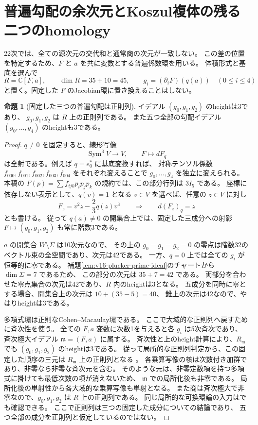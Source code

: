 \documentclass[a4paper,11pt]{ltjsarticle}
\theoremstyle{definition}
\newtheorem{proposition}[theorem]{命題}
\begin{document}
\section{普遍勾配の余次元とKoszul複体の残る二つのhomology}
\label{sec:v16-universal-koszul-height}

22次では、全ての源次元の交代和と通常商の次元が一致しない。
この差の位置を特定するため、$F$ と $a$ を共に変数とする普遍係数環を用いる。
体積形式と基底を選んで
\[
 R=\mathbb C[F,a],\qquad\dim R=35+10=45,
 \qquad g_i=(\partial_iF)(q(a))\quad(0\le i\le4)
\]
と置く。固定した $F$ のJacobian環に置き換えることはしない。

\begin{proposition}[固定した三つの普遍勾配は正則列]
\label{prop:v16-universal-three-gradient-regular}
イデアル $(g_0,g_1,g_2)$ のheightは3であり、
$g_0,g_1,g_2$ は $R$ 上の正則列である。
また五つ全部の勾配イデアル $(g_0,\ldots,g_4)$ のheightも3である。
\end{proposition}

\begin{proof}
$q\ne0$ を固定すると、線形写像
\[
 \operatorname{Sym}^3V\longrightarrow V,\qquad F\longmapsto dF_q
\]
は全射である。例えば $q=e_0^*$ に基底変換すれば、
対称テンソル係数 $f_{000},f_{001},f_{002},f_{003},f_{004}$ をそれぞれ変えることで
$g_0,\ldots,g_4$ を独立に変えられる。
本稿の $F(p)=\sum f_{ijk}p_ip_jp_k$ の規約では、この部分行列は $3I_5$ である。
座標に依存しない表示として、$q(v)=1$ となる $v\in V$ を選べば、任意の $z\in V$ に対し
\[
 F_z=v^2z-\frac23q(z)v^3
 \qquad\Longrightarrow\qquad d(F_z)_q=z
\]
とも書ける。
従って $q(a)\ne0$ の開集合上では、固定した三成分への射影
$F\mapsto(g_0,g_1,g_2)$ も常に階数3である。

$a$ の開集合 $W\setminus\Sigma$ は10次元なので、
その上の $g_0=g_1=g_2=0$ の零点は階数32のベクトル束の全空間であり、次元は42である。
一方、$q=0$ 上では全ての $g_i$ が恒等的に零である。
補題\ref{lem:v16-plucker-prime-ideal}のチャートから $\dim\Sigma=7$ であるため、
この部分の次元は $35+7=42$ である。
両部分を合わせた零点集合の次元は42であり、$R$ 内のheightは3となる。
五成分を同時に零とする場合、開集合上の次元は $10+(35-5)=40$、
錐上の次元は42なので、やはりheightは3である。

多項式環は正則なCohen--Macaulay環である。
ここで大域的な正則列へ戻すために斉次性を使う。
全ての $F,a$ 変数に次数1を与えると各 $g_i$ は5次斉次であり、
斉次極大イデアル $\mathfrak m=(F,a)$ に属する。
斉次性と上のheight計算により、$R_{\mathfrak m}$ でも
$(g_0,g_1,g_2)$ のheightは3である。
従って局所的な正則列判定から、この固定した順序の三元は
$R_{\mathfrak m}$ 上の正則列となる
\cite[Corollary~3.8]{SwanMKN}。
各乗算写像の核は次数付き加群であり、非零なら非零な斉次元を含む。
そのような元は、非零定数項を持つ多項式に掛けても最低次数の項が消えないため、
$\mathfrak m$ での局所化後も非零である。
局所化後の単射性から各大域的な乗算写像も単射となる。
また商は斉次極大で非零なので、$g_0,g_1,g_2$ は $R$ 上の正則列である。
同じ局所的な可換環論の入力は\cite[Tags 00NQ, 02JN]{StacksCMRegular}でも確認できる。
ここで正則列は三つの固定した成分についての結論であり、
五つ全部の成分を正則列と仮定しているのではない。
\end{proof}
\end{document}
